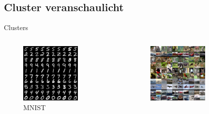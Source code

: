 \documentclass{beamer}
\begin{document}
\subsection{Cluster veranschaulicht}
\begin{frame}[t]{Clusters}\vspace{20pt}
\begin{columns}
\begin{column}{0.55\textwidth}
    \begin{figure}
    \centering
    \includegraphics[width=0.7\textwidth]{mnist_cluster.png}
    \caption{MNIST}
    \end{figure}
\end{column}
\begin{column}{0.55\textwidth}
    \begin{figure}
    \centering
    \includegraphics[width=0.7\textwidth]{stl-10_cluster.png}

\end{figure}
\end{column}
\end{columns}
\end{frame}
\end{document}
